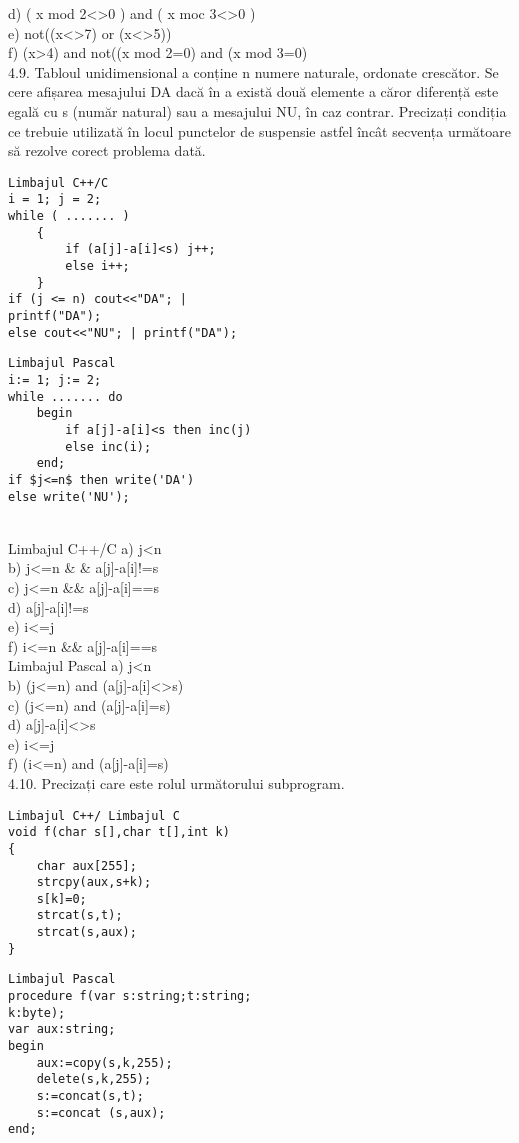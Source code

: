 d) ( x mod 2<>0 ) and ( x moc 3<>0 )
\\
e) not((x<>7) or (x<>5))
\\
f) (x>4) and not((x mod 2=0) and (x mod 3=0)
\\
4.9. Tabloul unidimensional a conține n numere naturale, ordonate crescător. Se cere afișarea mesajului DA dacă în a există două elemente a căror diferență este egală cu s (număr natural) sau a mesajului NU, în caz contrar. Precizați condiția ce trebuie utilizată în locul punctelor de suspensie astfel încât secvența următoare să rezolve corect problema dată.
\begin{verbatim}
Limbajul C++/C
i = 1; j = 2;
while ( ....... )
    {
        if (a[j]-a[i]<s) j++;
        else i++;
    }
if (j <= n) cout<<"DA"; |
printf("DA");
else cout<<"NU"; | printf("DA");
\end{verbatim}
\begin{verbatim}
Limbajul Pascal
i:= 1; j:= 2;
while ....... do
    begin
        if a[j]-a[i]<s then inc(j)
        else inc(i);
    end;
if $j<=n$ then write('DA')
else write('NU');
\end{verbatim}
\\
Limbajul C++/C
a) j<n
\\
b) j<=n \& & a[j]-a[i]!=s
\\
c) j<=n \&\& a[j]-a[i]==s
\\
d) a[j]-a[i]!=s
\\
e) i<=j
\\
f) i<=n \&\& a[j]-a[i]==s
\\
Limbajul Pascal
a) j<n
\\
b) (j<=n) and (a[j]-a[i]<>s)
\\
c) (j<=n) and (a[j]-a[i]=s)
\\
d) a[j]-a[i]<>s
\\
e) i<=j
\\
f) (i<=n) and (a[j]-a[i]=s)
\\
4.10. Precizați care este rolul următorului subprogram.
\begin{verbatim}
Limbajul C++/ Limbajul C
void f(char s[],char t[],int k)
{
    char aux[255];
    strcpy(aux,s+k);
    s[k]=0;
    strcat(s,t);
    strcat(s,aux);
}
\end{verbatim}
\begin{verbatim}
Limbajul Pascal
procedure f(var s:string;t:string;
k:byte);
var aux:string;
begin
    aux:=copy(s,k,255);
    delete(s,k,255);
    s:=concat(s,t);
    s:=concat (s,aux);
end;
\end{verbatim}
\\
